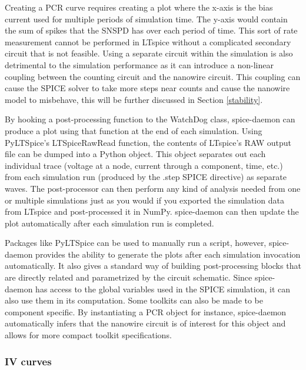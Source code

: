 \documentclass{article}
\newcommand{\cf}[1]{\textsf{#1}}
\begin{document}
Creating a PCR curve requires creating a plot where the x-axis is the bias current used for multiple
periods of simulation time. The y-axis would contain the sum of spikes that the SNSPD has over each period
of time. This sort of rate measurement cannot be performed in LTspice without a complicated secondary circuit
that is not feasible. Using a separate circuit within the simulation is also detrimental to the simulation
performance as it can introduce a non-linear coupling between the counting circuit and the nanowire circuit.
This coupling can cause the SPICE solver to take more steps near counts and cause the nanowire model to
misbehave, this will be further discussed in Section \ref{stability}.

By hooking a post-processing function to the \cf{WatchDog} class, spice-daemon can produce a plot
using that function at the end of each simulation. Using \cf{PyLTSpice}'s \cf{LTSpiceRawRead}
function, the contents of LTspice's RAW output file can be dumped into a Python object. This object
separates out each individual trace (voltage at a node, current through a component, time, etc.)
from each simulation run (produced by the \cf{.step} SPICE directive) as separate waves. The 
post-processor can then perform any kind of analysis needed from one or multiple simulations
just as you would if you exported the simulation data from LTspice and post-processed it in
\cf{NumPy}. spice-daemon can then update the plot automatically after each simulation run is completed.

Packages like \cf{PyLTSpice} can be used to manually 
run a script, however, spice-daemon
provides the ability to generate the plots after each simulation invocation automatically.
It also gives a standard way of building post-processing blocks that are directly related
and parametrized by the circuit schematic. Since spice-daemon has access to the global
variables used in the SPICE simulation, it can also use them in its computation.
Some toolkits can also be made to be component specific. By instantiating a PCR object
for instance, spice-daemon automatically infers that the nanowire circuit is of interest
for this object and allows for more compact toolkit specifications.

\subsubsection{IV curves}
\end{document}
